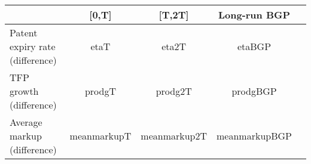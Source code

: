 \documentclass[9pt]{article}
\begin{document}
\begin{table}[ht]
\begin{tabular}{l|cccc}
\hline
\hline
 & [0,T] & [T,2T] & Long-run BGP \\ 
\hline
Patent expiry rate (difference) & etaT & eta2T & etaBGP \\
TFP growth (difference) & prodgT & prodg2T & prodgBGP \\
Average markup (difference) & meanmarkupT & meanmarkup2T & meanmarkupBGP \\
\hline
\end{tabular}
\end{table}
\end{document}
